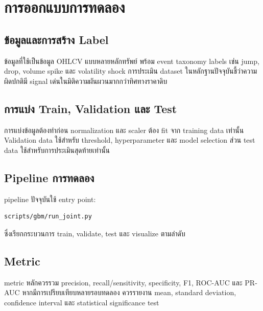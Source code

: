 \chapter{การออกแบบการทดลอง}

\section{ข้อมูลและการสร้าง Label}

ข้อมูลที่ใช้เป็นข้อมูล OHLCV แบบหลายหลักทรัพย์ พร้อม event taxonomy labels เช่น jump, drop, volume spike และ volatility shock การประเมิน dataset ในหลักฐานปัจจุบันชี้ว่าความผิดปกติมี signal เด่นในมิติความผันผวนมากกว่าทิศทางราคาดิบ

\section{การแบ่ง Train, Validation และ Test}

การแบ่งข้อมูลต้องทำก่อน normalization และ scaler ต้อง fit จาก training data เท่านั้น Validation data ใช้สำหรับ threshold, hyperparameter และ model selection ส่วน test data ใช้สำหรับการประเมินสุดท้ายเท่านั้น

\section{Pipeline การทดลอง}

pipeline ปัจจุบันใช้ entry point:

\begin{verbatim}
scripts/gbm/run_joint.py
\end{verbatim}

ซึ่งเรียกกระบวนการ train, validate, test และ visualize ตามลำดับ

\section{Metric}

metric หลักควรรวม precision, recall/sensitivity, specificity, F1, ROC-AUC และ PR-AUC หากมีการเปรียบเทียบหลายรอบทดลอง ควรรายงาน mean, standard deviation, confidence interval และ statistical significance test

